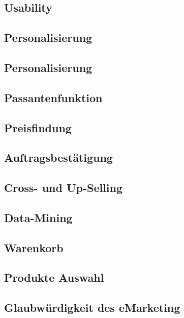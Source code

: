 \subsection{Usability}

\subsection{Personalisierung}

\subsection{Personalisierung}

\subsection{Passantenfunktion}

\subsection{Preisfindung}

\subsection{Auftragsbestätigung}

\subsection{Cross- und Up-Selling}

\subsection{Data-Mining}

\subsection{Warenkorb}

\subsection{Produkte Auswahl}

\subsection{Glaubwürdigkeit des eMarketing}

